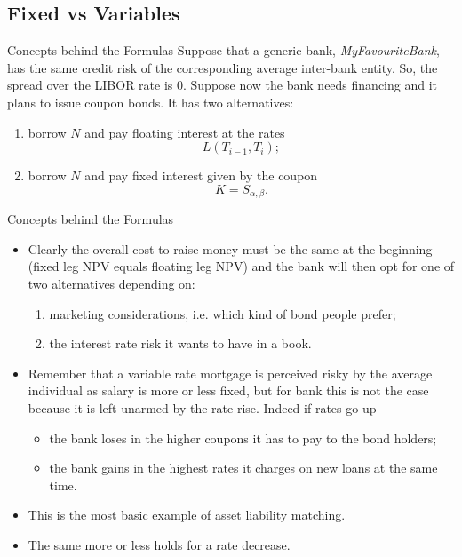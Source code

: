 \documentclass{beamer}
\begin{document}
\subsection{Fixed vs Variables}
\begin{frame}{Concepts behind the Formulas}
	Suppose that a generic bank, \emph{MyFavouriteBank}, has the same credit risk of the corresponding average inter-bank entity. So, the spread over the LIBOR rate is 0. Suppose now the bank needs financing and it plans to issue coupon bonds. It has two alternatives:
	\begin{enumerate}
		\item borrow $N$ and pay floating interest at the rates
		\begin{equation*}
			L(T_{i-1},T_i);
		\end{equation*}
		\item borrow $N$ and pay fixed interest given by the coupon
		\begin{equation*}
			K = S_{\alpha,\beta}.
		\end{equation*}
	\end{enumerate}
\end{frame}

\begin{frame}{Concepts behind the Formulas}
	\begin{itemize}
		\item Clearly the overall cost to raise money must be the same at the beginning (fixed leg NPV equals floating leg NPV) and the bank will then opt for one of two alternatives depending on:
		\begin{enumerate}
			\item marketing considerations, i.e. which kind of bond people prefer;
			\item the interest rate risk it wants to have in a book.
		\end{enumerate} 
		\item Remember that a variable rate mortgage is perceived risky by the average individual as salary is more or less fixed, but for bank this is not the case because it is left unarmed by the rate rise. Indeed if rates go up
		\begin{itemize}
			\item the bank loses in the higher coupons it has to pay to the bond holders;
			\item the bank gains in the highest rates it charges on new loans at the same time.
		\end{itemize}
		\item This is the most basic example of asset liability matching.
		\item The same more or less holds for a rate decrease.%
	\end{itemize}
\end{frame}
\end{document}
